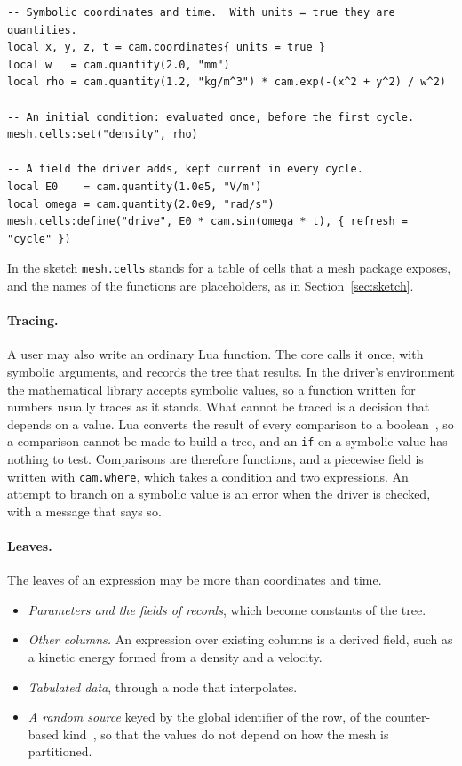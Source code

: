 \documentclass[11pt,a4paper]{article}
\newcommand{\code}[1]{\texttt{#1}}
\begin{document}
\begin{lstlisting}[language={[5.3]Lua}]
-- Symbolic coordinates and time.  With units = true they are quantities.
local x, y, z, t = cam.coordinates{ units = true }
local w   = cam.quantity(2.0, "mm")
local rho = cam.quantity(1.2, "kg/m^3") * cam.exp(-(x^2 + y^2) / w^2)

-- An initial condition: evaluated once, before the first cycle.
mesh.cells:set("density", rho)

-- A field the driver adds, kept current in every cycle.
local E0    = cam.quantity(1.0e5, "V/m")
local omega = cam.quantity(2.0e9, "rad/s")
mesh.cells:define("drive", E0 * cam.sin(omega * t), { refresh = "cycle" })
\end{lstlisting}

In the sketch \code{mesh.cells} stands for a table of cells that a mesh
package exposes, and the names of the functions are placeholders, as in
Section~\ref{sec:sketch}.

\paragraph{Tracing.}  A user may also write an ordinary Lua function.  The
core calls it once, with symbolic arguments, and records the tree that
results.  In the driver's environment the mathematical library accepts
symbolic values, so a function written for numbers usually traces as it
stands.  What cannot be traced is a decision that depends on a value.  Lua
converts the result of every comparison to a boolean~\cite{lua55}, so a
comparison cannot be made to build a tree, and an \code{if} on a symbolic
value has nothing to test.  Comparisons are therefore functions, and a
piecewise field is written with \code{cam.where}, which takes a condition
and two expressions.  An attempt to branch on a symbolic value is an error
when the driver is checked, with a message that says so.

\paragraph{Leaves.}  The leaves of an expression may be more than
coordinates and time.

\begin{itemize}
  \item \emph{Parameters and the fields of records}, which become constants
        of the tree.
  \item \emph{Other columns.}  An expression over existing columns is a
        derived field, such as a kinetic energy formed from a density and a
        velocity.
  \item \emph{Tabulated data}, through a node that interpolates.
  \item \emph{A random source} keyed by the global identifier of the row,
        of the counter-based kind~\cite{random123}, so that the values do
        not depend on how the mesh is partitioned.
\end{itemize}
\end{document}
